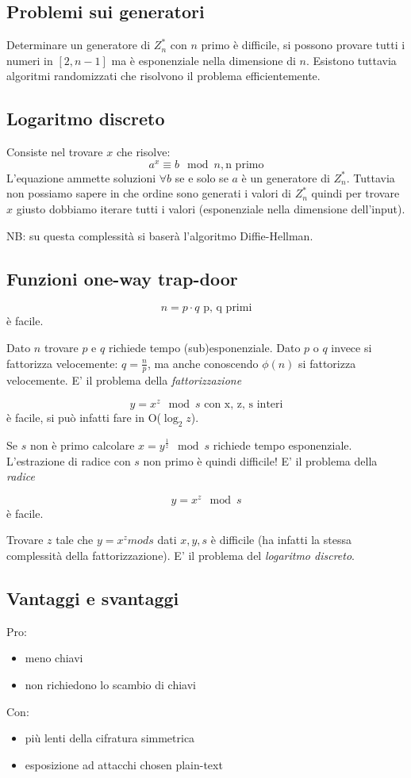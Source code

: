 \subsection{Problemi sui generatori}
Determinare un generatore di $Z_n^*$ con $n$ primo è difficile, si possono provare tutti i numeri in $[2, n-1]$ ma è esponenziale nella dimensione di $n$.
Esistono tuttavia algoritmi randomizzati che risolvono il problema efficientemente.

\subsection{Logaritmo discreto}
Consiste nel trovare $x$ che risolve:
$$ a^x \equiv b \mod n, \text{n primo} $$
L'equazione ammette soluzioni $\forall b$ se e solo se $a$ è un generatore di $Z_n^*$.
Tuttavia non possiamo sapere in che ordine sono generati i valori di $Z_n^*$ quindi per trovare $x$ giusto dobbiamo iterare tutti i valori (esponenziale nella dimensione dell'input).

NB: su questa complessità si baserà l'algoritmo Diffie-Hellman.

\subsection{Funzioni one-way trap-door}
$$ n = p \cdot q \text{ p, q primi} $$
è facile.

Dato $n$ trovare $p$ e $q$ richiede tempo (sub)esponenziale. Dato $p$ o $q$ invece si fattorizza velocemente: $q = \frac{n}{p}$, ma anche conoscendo $\phi(n)$ si fattorizza velocemente. E' il problema della \emph{fattorizzazione}

$$ y = x^z \mod s \text{ con x, z, s interi} $$
è facile, si può infatti fare in O($\log_2z$).

Se $s$ non è primo calcolare $x = y^{\frac{1}{z}} \mod s$ richiede tempo esponenziale.
L'estrazione di radice con $s$ non primo è quindi difficile! E' il problema della \emph{radice}

$$y = x^z \mod s $$
è facile.

Trovare $z$ tale che $y = x^z mod s$ dati $x, y, s$ è difficile (ha infatti la stessa complessità della fattorizzazione). E' il problema del \emph{logaritmo discreto}.

\subsection{Vantaggi e svantaggi}
Pro:
\begin{itemize}
    \item meno chiavi
    \item non richiedono lo scambio di chiavi
\end{itemize}
Con:
\begin{itemize}
    \item più lenti della cifratura simmetrica
    \item esposizione ad attacchi chosen plain-text
\end{itemize}

